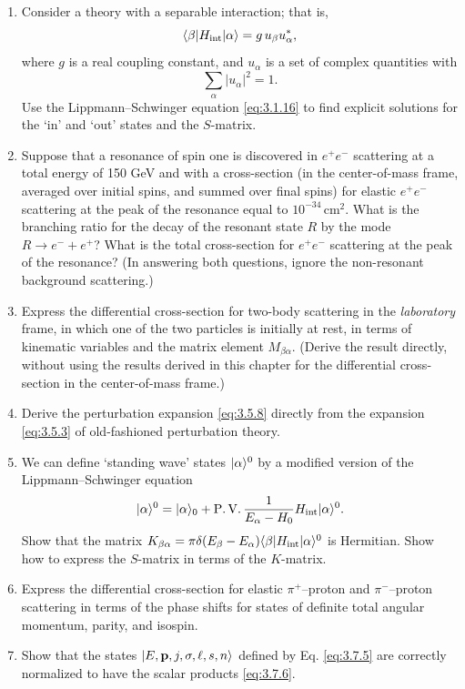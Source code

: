 \begin{enumerate}
\item Consider a theory with a separable interaction; that is,
  \[
    \langle\beta|H_{\rm int}|\alpha\rangle=g\,u_\beta u_\alpha^*,
  \]
  where $g$ is a real coupling constant, and $u_\alpha$ is a set of complex
  quantities with
  \[
    \sum_\alpha|u_\alpha|^2=1.
  \]
  Use the Lippmann--Schwinger equation \eqref{eq:3.1.16} to find explicit solutions for
  the `in' and `out' states and the $S$-matrix.

\item Suppose that a resonance of spin one is discovered in $e^+e^-$
  scattering at a total energy of 150 GeV and with a cross-section (in the
  center-of-mass frame, averaged over initial spins, and summed over final
  spins) for elastic $e^+e^-$ scattering at the peak of the resonance equal to
  $10^{-34}\,\mathrm{cm}^2$. What is the branching ratio for the decay of the
  resonant state $R$ by the mode $R\to e^-+e^+$? What is the total
  cross-section for $e^+e^-$ scattering at the peak of the resonance? (In
  answering both questions, ignore the non-resonant background scattering.)

\item Express the differential cross-section for two-body scattering in the
  \emph{laboratory} frame, in which one of the two particles is initially at
  rest, in terms of kinematic variables and the matrix element
  $M_{\beta\alpha}$. (Derive the result directly, without using the results
  derived in this chapter for the differential cross-section in the
  center-of-mass frame.)

\item Derive the perturbation expansion \eqref{eq:3.5.8} directly from the expansion
  \eqref{eq:3.5.3} of old-fashioned perturbation theory.

\item We can define `standing wave' states $\lvert \alpha\rangle^{0}$ by a modified
  version of the Lippmann--Schwinger equation
  \[
    \lvert \alpha\rangle^{0}=\lvert \alpha\rangle_0
    +\operatorname{P.V.}\frac{1}{E_\alpha-H_0}
      H_{\rm int}\lvert \alpha\rangle^{0}.
  \]
  Show that the matrix
  $K_{\beta\alpha}=\pi\delta(E_\beta-E_\alpha)
  \langle\beta|H_{\rm int}|\alpha\rangle^0$ is Hermitian. Show how to express
  the $S$-matrix in terms of the $K$-matrix.

\item Express the differential cross-section for elastic $\pi^+$--proton and
  $\pi^-$--proton scattering in terms of the phase shifts for states of
  definite total angular momentum, parity, and isospin.

\item Show that the states $\lvert E,\mathbf p,j,\sigma,\ell,s,n\rangle$ defined by
  Eq. \eqref{eq:3.7.5} are correctly normalized to have the scalar products \eqref{eq:3.7.6}.
\end{enumerate}

